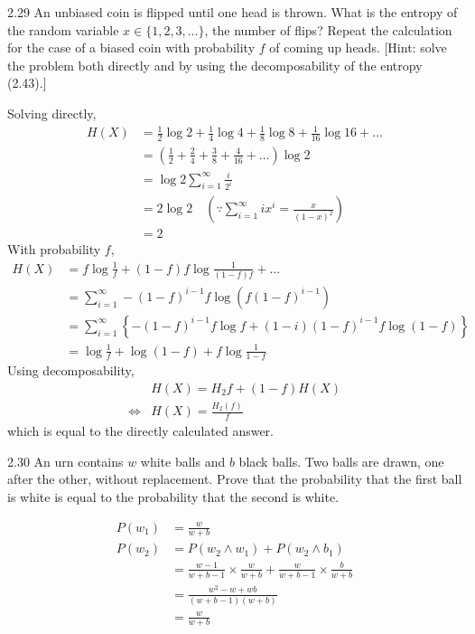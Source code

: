 \documentclass[12pt, a4paper]{article}
\begin{document}
\begin{prob}{2.29}
    An unbiased coin is flipped until one head is thrown. What is the entropy of the random variable $x \in \{1, 2, 3, \dots\}$, the number of flips? Repeat the calculation for the case of a biased coin with probability $f$ of coming up heads. [Hint: solve the problem both directly and by using the decomposability of the entropy (2.43).]
\end{prob}
\begin{sol}
    Solving directly, 
    \begin{align*}
        H(X) &= \frac{1}{2} \log 2 + \frac{1}{4} \log 4 + \frac{1}{8} \log 8 + \frac{1}{16} \log 16 + \dots \\
        &= (\frac{1}{2} + \frac{2}{4} + \frac{3}{8} + \frac{4}{16} + \dots) \log 2 \\
        &= \log 2 \sum_{i=1}^{\infty} \frac{i}{2^i} \\
        &= 2 \log 2 \quad (\because \sum_{i=1}^{\infty} ix^i = \frac{x}{(1-x)^2})\\
        &= 2
    \end{align*}
    With probability $f$,
    \begin{align*}
        H(X) &= f \log \frac{1}{f} + (1-f)f \log \frac{1}{(1-f)f} + \dots \\
        &= \sum_{i=1}^{\infty} -(1-f)^{i-1} f \log(f(1-f)^{i-1}) \\
        &= \sum_{i=1}^{\infty} \left\{ -(1-f)^{i-1}f \log f + (1-i)(1-f)^{i-1}f \log(1-f) \right\} \\
        &= \log \frac{1}{f} + \log (1-f) + f \log \frac{1}{1-f}
    \end{align*}
    Using decomposability,
    \begin{align*}
        & H(X) = H_2{f} + (1-f)H(X) \\
        \iff & H(X) = \frac{H_2(f)}{f}
    \end{align*}
    which is equal to the directly calculated answer.
\end{sol}
\bigskip

\begin{prob}{2.30}
    An urn contains $w$ white balls and $b$ black balls. Two balls are drawn, one after the other, without replacement. Prove that the probability that the first ball is white is equal to the probability that the second is white.
\end{prob}
\begin{sol}
    \begin{align}
        P(w_1) &= \frac{w}{w+b} \\
        P(w_2) &= P(w_2 \land w_1) + P(w_2 \land b_1) \\
        &= \frac{w-1}{w+b-1} \times \frac{w}{w+b} + \frac{w}{w+b-1} \times \frac{b}{w+b} \\
        &= \frac{w^2 - w + wb}{(w+b-1)(w+b)} \\
        &= \frac{w}{w+b}
    \end{align}
\end{sol}
\bigskip
\end{document}
